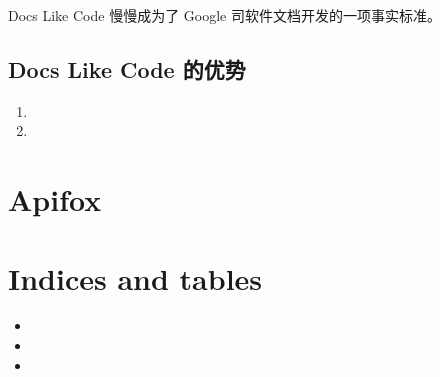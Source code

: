 \documentclass[letterpaper,10pt,english]{sphinxmanual}
\begin{document}
\sphinxAtStartPar
Docs Like Code 慢慢成为了 Google 司软件文档开发的一项事实标准。


\section{Docs Like Code 的优势}
\label{\detokenize{Dock-like-code:id2}}\begin{enumerate}
%
\item {} 
\sphinxAtStartPar
{}

\item {} 
\sphinxAtStartPar
{}

\end{enumerate}


\chapter{Apifox}
\label{\detokenize{Apifox:apifox}}\label{\detokenize{Apifox::doc}}

\chapter{Indices and tables}
\label{\detokenize{index:indices-and-tables}}\begin{itemize}
\item {} 
\sphinxAtStartPar
{}

\item {} 
\sphinxAtStartPar
{}

\item {} 
\sphinxAtStartPar
{}

\end{itemize}



\renewcommand{\indexname}{Index}
\printindex
\end{document}
